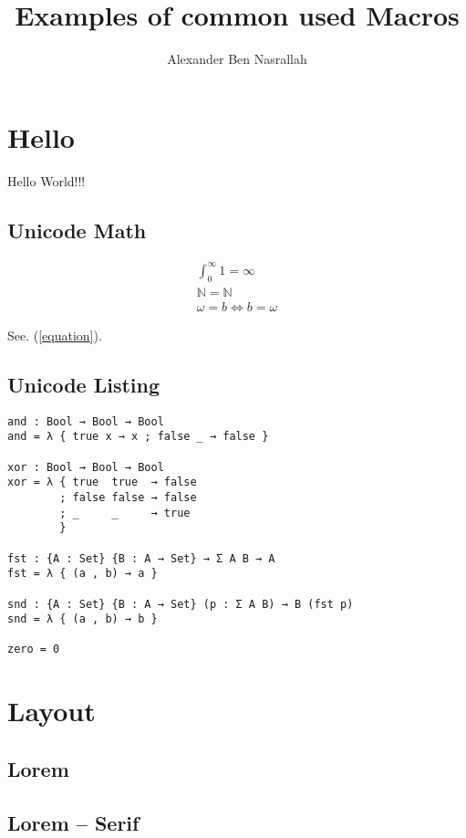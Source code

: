 \documentclass[titlepage,12pt]{article}
\author{Alexander Ben Nasrallah}
\title{Examples of common used Macros}
\begin{document}
\maketitle


\toc{}

\section{Hello}
Hello World!!!

\subsection{Unicode Math}
\begin{align}
	∫_0^∞ 1 = ∞ \\
	\mathbb{N} = ℕ \label{equation}\\
	ω = b ⇔ b = ω
\end{align}

See. (\ref{equation}).

\subsection{Unicode Listing}
\begin{lstlisting}
and : Bool → Bool → Bool
and = λ { true x → x ; false _ → false }

xor : Bool → Bool → Bool
xor = λ { true  true  → false
        ; false false → false
        ; _     _     → true
        }

fst : {A : Set} {B : A → Set} → Σ A B → A
fst = λ { (a , b) → a }

snd : {A : Set} {B : A → Set} (p : Σ A B) → B (fst p)
snd = λ { (a , b) → b }

zero = 0
\end{lstlisting}

\section{Layout}
\subsection{Lorem}
\lipsum[2-4]

\subsection{Lorem -- Serif}
\textrm{\lipsum[2-4]}
\end{document}

